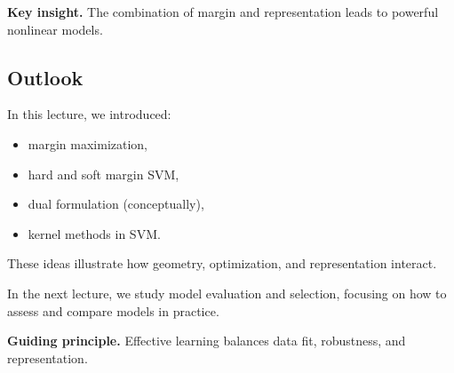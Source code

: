 \medskip

\noindent
\textbf{Key insight.}  
The combination of margin and representation leads to powerful nonlinear models.

\subsection{Outlook}

In this lecture, we introduced:

\begin{itemize}
    \item margin maximization,
    \item hard and soft margin SVM,
    \item dual formulation (conceptually),
    \item kernel methods in SVM.
\end{itemize}

\medskip

\noindent
These ideas illustrate how geometry, optimization, and representation interact.

\medskip

\noindent
In the next lecture, we study model evaluation and selection, focusing on how to assess and compare models in practice.

\medskip

\noindent
\textbf{Guiding principle.}  
Effective learning balances data fit, robustness, and representation.